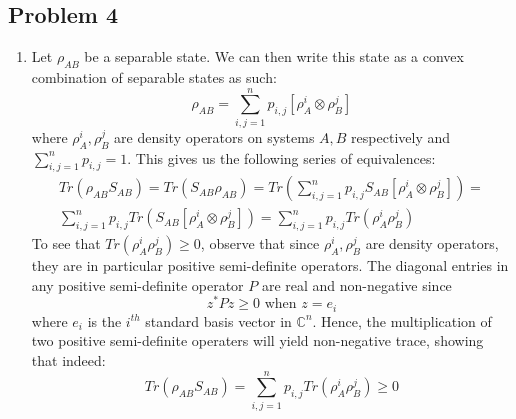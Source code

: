 \documentclass[12pt]{article}%
\begin{document}
  \subsection*{Problem 4}
  \begin{enumerate}
    \item Let $\rho_{AB}$ be a separable state. We can then write this state as a convex combination of separable states as such:
    $$\rho_{AB} = \sum_{i,j=1}^n p_{i,j} [\rho_{A}^i \otimes \rho_{B}^j] $$ where $\rho_A^i,\rho_B^j$  are density operators on systems $A,B$ respectively and $\sum_{i,j=1}^n p_{i,j} = 1$. This gives us the following series of equivalences:
    \begin{gather*}
        Tr(\rho_{AB}S_{AB}) = Tr(S_{AB}\rho_{AB}) = Tr(\sum_{i,j=1}^n p_{i,j} S_{AB}[\rho_{A}^i \otimes \rho_{B}^j]) = \\
        \sum_{i,j=1}^n p_{i,j}Tr(S_{AB}[\rho_{A}^i \otimes \rho_{B}^j]) =
        \sum_{i,j=1}^n p_{i,j}Tr(\rho_{A}^i \rho_{B}^j)
    \end{gather*}
    To see that $Tr(\rho_{A}^i \rho_{B}^j) \geq 0$, observe that since $\rho_A^i,\rho_B^j$ are density operators, they are in particular positive semi-definite operators. The diagonal entries in any positive semi-definite operator $P$ are real and non-negative since
    $$ z^*Pz \geq 0 \text{ when } z = e_i $$ where $e_i$ is the $i^{th}$ standard basis vector in $\mathbb{C}^n$.
    Hence, the multiplication of two positive semi-definite operaters will yield non-negative trace, showing that indeed:
    $$Tr(\rho_{AB}S_{AB}) = \sum_{i,j=1}^n p_{i,j}Tr(\rho_{A}^i \rho_{B}^j) \geq 0 $$


\end{enumerate}
\end{document}
